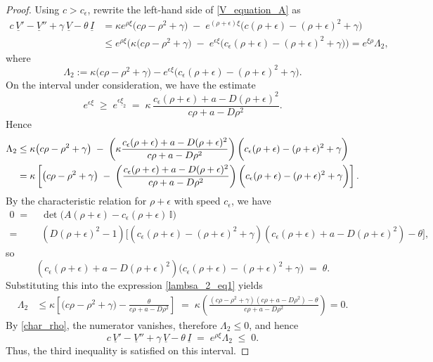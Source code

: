 \documentclass[11pt]{article}
\theoremstyle{definition}
\begin{document}
\begin{proof}
{Using $c>c_\epsilon$, rewrite the left-hand side of \eqref{V_equation_A} as 
\begin{align}
     c\,\underline{V}' - \underline{V}'' + \gamma\,\underline{V} - \theta\,\underline{I}
    &= 
    \kappa e^{\rho \xi}\bigl(c\rho - \rho^{2} + \gamma \bigr)
    \;-\;
    e^{(\rho+\epsilon)\xi} \bigl( c(\rho+\epsilon) - (\rho+\epsilon)^{2} + \gamma \bigr)\\ &\le e^{\rho \xi} \bigg(\kappa  \bigl(c\rho - \rho^{2} + \gamma \bigr)
    \;-\;
    e^{\epsilon\xi} \bigl( c_\epsilon(\rho+\epsilon) - (\rho+\epsilon)^{2} + \gamma \big)\bigg)=e^{\xi \rho}\Lambda_2,
\end{align}
where
\[
\Lambda_{2}
:= \kappa\bigl(c\rho - \rho^{2} + \gamma\bigr)
    - e^{\epsilon\xi}\bigl(c_\epsilon(\rho+\epsilon) - (\rho+\epsilon)^{2} + \gamma\bigr).
\]
On the interval under consideration, we have the estimate
\[
e^{\epsilon\xi}\;\ge\; e^{\epsilon \underline{\xi}_2}
    \;=\; \kappa\,\frac{c_{\epsilon}(\rho+\epsilon)+a-D(\rho+\epsilon)^{2}}
                   {c\rho + a - D\rho^{2}}.
\] Hence
\begin{align}\label{lambsa_2_eq1}
    \Lambda_2 &\le \kappa  \bigl(c\rho - \rho^{2} + \gamma \bigr)
    \;-\;
   \left( \kappa\dfrac{c_\epsilon(\rho+\epsilon)+a-D(\rho+\epsilon)^2}{c\rho+a-D\rho^2}\right) \bigg( c_\epsilon(\rho+\epsilon) - (\rho+\epsilon)^{2} + \gamma \bigg)\\ \notag & = \kappa \left[ \bigl(c\rho - \rho^{2} + \gamma \bigr)
    \;-\;
   \left( \dfrac{c_\epsilon(\rho+\epsilon)+a-D(\rho+\epsilon)^2}{c\rho+a-D\rho^2}\right) \bigg( c_\epsilon(\rho+\epsilon) - (\rho+\epsilon)^{2} + \gamma \bigg)\right].
\end{align}
By the characteristic relation for $\rho+\epsilon$ with speed $c_{\epsilon}$, we have
\begin{align}\label{char_rho_eps}
0 \;=&\; \det\!\bigl(A(\rho+\epsilon) - c_{\epsilon}(\rho+\epsilon)\,\mathbb{I}\bigr)
    \; \\=&\; (D(\rho+\epsilon)^{2}-1)\Big[(c_{\epsilon}(\rho+\epsilon) - (\rho+\epsilon)^{2} + \gamma)
    (c_{\epsilon}(\rho+\epsilon)+a-D(\rho+\epsilon)^{2}) - \theta\Big],
\end{align}
so
\[
(c_{\epsilon}(\rho+\epsilon)+a-D(\rho+\epsilon)^{2})
\bigl(c_{\epsilon}(\rho+\epsilon) - (\rho+\epsilon)^{2} + \gamma\bigr)
    \;=\; \theta.
\]
Substituting this into the expression \eqref{lambsa_2_eq1} yields
\begin{align}
\Lambda_{2}
&\le \kappa\left[
      \bigl(c\rho - \rho^{2} + \gamma\bigr)
      - \frac{\theta}{c\rho + a - D\rho^{2}}
      \right]
\;=\; \kappa\left(\frac{(c\rho - \rho^{2} + \gamma)(c\rho + a - D\rho^{2}) - \theta}
                     {c\rho + a - D\rho^{2}}\right)=0.
\end{align}
By \eqref{char_rho}, the numerator vanishes, therefore $\Lambda_{2}\le 0$, and hence
\[
c\,\underline{V}' - \underline{V}'' + \gamma\,\underline{V} - \theta\,\underline{I}
    \;=\; e^{\rho\xi}\Lambda_{2} \;\le\; 0.
\]
Thus, the third inequality is satisfied on this interval.

}
\end{proof}
\end{document}
